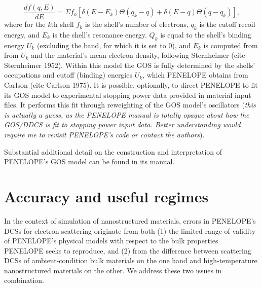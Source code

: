 \documentclass [11pt, proquest, article] {uwthesis}[2016/11/22]
\begin{document}
$$
\frac{df(q, E)}{dE} = \Sigma f_k [\delta(E - E_k) \Theta (q_k - q) + \delta(E-q) \Theta(q - q_k)],
$$
where for the \emph{k}th shell $f_k$ is the shell's number of electrons, $q_k$ is the cutoff recoil energy, and $E_k$ is the shell's resonance energy. $Q_k$ is equal to the shell's binding energy $U_k$ (excluding the band, for which it is set to 0), and $E_k$ is computed from from $U_k$ and the material's mean electron density, following Sternheimer (cite Sternheimer 1952). Within this model the GOS is fully determined by the shells' occupations and cutoff (binding) energies $U_k$, which PENELOPE obtains from Carlson (cite Carlson 1975). It is possible, optionally, to direct PENELOPE to fit its GOS model to experimental stopping power data provided in material input files. It performs this fit through reweighting of the GOS model's oscillators (\emph{this is actually a guess, as the PENELOPE manual is totally opaque about how the GOS/DDCS is fit to stopping power input data. Better understanding would require me to revisit PENELOPE's code or contact the authors}).

Substantial additional detail on the construction and interpretation of PENELOPE's GOS model can be found in its manual.


\section{Accuracy and useful regimes}
In the context of simulation of nanostructured materials, errors in PENELOPE's DCSs for electron scattering originate from both (1) the limited range of validity of PENELOPE's physical models with respect to the bulk properties PENELOPE seeks to reproduce, and (2) from the difference between scattering DCSs of ambient-condition bulk materials on the one hand and high-temperature nanostructured materials on the other. We address these two issues in combination.
\end{document}
